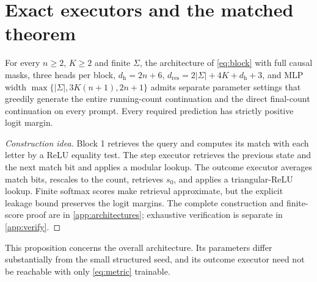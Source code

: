 \section{Exact executors and the matched theorem}\label{sec:results}
\begin{proposition}\label{prop:represent}
For every $n\ge2$, $K\ge2$ and finite $\Sigma$, the architecture of \cref{eq:block} with full causal masks, three heads per block, $d_{\mathrm h}=2n+6$, $d_{\mathrm{res}}=2|\Sigma|+4K+d_{\mathrm h}+3$, and MLP width $\max\{|\Sigma|,3K(n+1),2n+1\}$ admits separate parameter settings that greedily generate the entire running-count continuation and the direct final-count continuation on every prompt. Every required prediction has strictly positive logit margin.
\end{proposition}
\begin{proof}[Construction idea]
Block 1 retrieves the query and computes its match with each letter by a ReLU equality test. The step executor retrieves the previous state and the next match bit and applies a modular lookup. The outcome executor averages match bits, rescales to the count, retrieves $s_0$, and applies a triangular-ReLU lookup. Finite softmax scores make retrieval approximate, but the explicit leakage bound preserves the logit margins. The complete construction and finite-score proof are in \cref{app:architectures}; exhaustive verification is separate in \cref{app:verify}.
\end{proof}
This proposition concerns the overall architecture. Its parameters differ substantially from the small structured seed, and its outcome executor need not be reachable with only \cref{eq:metric} trainable.

